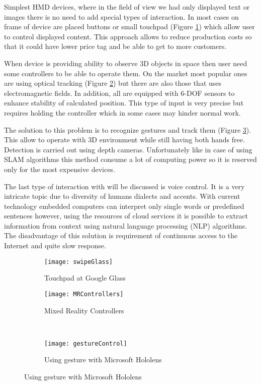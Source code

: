 \documentclass[printmode,en]{mgr}
\begin{document}
Simplest HMD devices, where in the field of view we had only displayed text or images there is no need to add special types of interaction. In most cases on frame of device are placed buttons or small touchpad (Figure \ref{fig:swipeGlass}) which allow user to control displayed content. This approach allows to reduce production costs so that it could have lower price tag and be able to get to more customers.

When device is providing ability to observe 3D objects in space then user need some controllers to be able to operate them. On the market most popular ones are using optical tracking (Figure \ref{fig:MRControllers}) but there are also those that uses electromagnetic fields. In addition, all are equipped with 6-DOF sensors to enhance stability of calculated position. This type of input is very precise but requires holding the controller which in some cases may hinder normal work.

The solution to this problem is to recognize gestures and track them (Figure \ref{fig:gestureControl}). This allow to operate with 3D environment while still having both hands free. Detection is carried out using depth cameras. Unfortunately like in case of using SLAM algorithms this method consume a lot of computing power so it is reserved only for the most expensive devices.

The last type of interaction with will be discussed is voice control. It is a very intricate topic due to diversity of humans dialects and accents. With current technology embedded computers can interpret only single words or predefined sentences however, using the resources of cloud services it is possible to extract information from context using natural language processing (NLP) algorithms. The disadvantage of this solution is requirement of continuous access to the Internet and quite slow response.

\begin{figure}[!ht]
\centering
\begin{subfigure}{.5\textwidth}
  \centering
  \texttt{[image: swipeGlass]}
  \caption{Touchpad at Google Glass \cite{swipeGlass}}
  \label{fig:swipeGlass}
\end{subfigure}%
\begin{subfigure}{.5\textwidth}
  \centering
  \texttt{[image: MRControllers]}
  \caption{Mixed Reality Controllers \cite{MRControllers}}
  \label{fig:MRControllers}
\end{subfigure}\\
\begin{subfigure}{.5\textwidth}
  \centering
  \texttt{[image: gestureControl]}
  \caption{Using gesture with Microsoft Hololens \cite{gestureControl}}
  \label{fig:gestureControl}
\end{subfigure}%
\label{fig:ARInteraction}
\end{figure}
\end{document}
